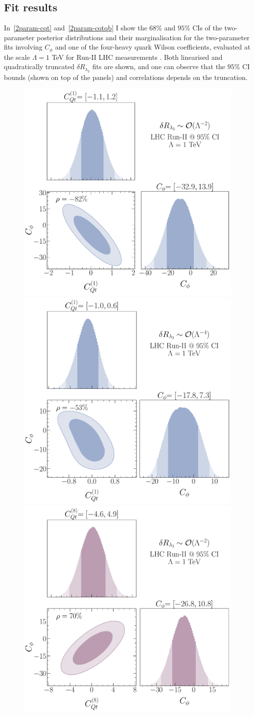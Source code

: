 \subsection{Fit results}
\par 
In~\autoref{2param-cqt} and~\autoref{2param-cqtqb} I show the $68\%$ and $ 95\%$  CIs of the two-parameter posterior distributions and their marginalisation for the two-parameter fits involving $C_\phi$ and one of the four-heavy quark Wilson coefficients, evaluated at the scale $\Lambda=1$ TeV for Run-II LHC measurements .  
Both linearised and quadratically truncated $\delta R_{\lambda_3}$ fits are shown, and one can observe that the $95\%$ CI bounds (shown on top of the panels) and correlations depends on the truncation.
\begin{figure}[h!]
	\begin{center}
		\includegraphics[width=0.45\linewidth]{fig/Cqt1_LHC_RunII_linearl3_rge}
		\includegraphics[width=0.45\linewidth]{fig/Cqt1_LHC_RunII_quadl3_rge} \\ 
		\includegraphics[width=0.45\linewidth]{fig/Cqt8_LHC_RunII_linearl3_rge}

\end{center}
\end{figure}
